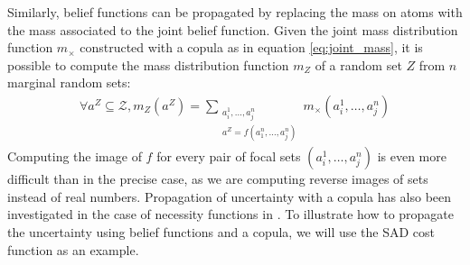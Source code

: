 Similarly, belief functions can be propagated by replacing the mass on atoms with the mass associated to the joint belief function. Given the joint mass distribution function $m_\times$ constructed with a copula as in equation \eqref{eq:joint_mass}, it is possible to compute the mass distribution function $m_Z$ of a random set $Z$ from $n$ marginal random sets:
\begin{align}
    \forall a^Z\subseteq\mathcal{Z}, m_Z(a^Z) = \sum_{\substack{a^1_i, \dots, a^n_j\\a^Z=f(a^n_1,\dots, a^n_j)}}m_\times(a^1_i, \dots, a^n_j)\label{eq:mass_propagated}
\end{align}
Computing the image of $f$ for every pair of focal sets $(a^1_i, \dots, a^n_j)$ is even more difficult than in the precise case, as we are computing reverse images of sets instead of real numbers. Propagation of uncertainty with a copula has also been investigated in the case of necessity functions in \cite{gray_dependent_2021}. To illustrate how to propagate the uncertainty using belief functions and a copula, we will use the SAD cost function as an example.

